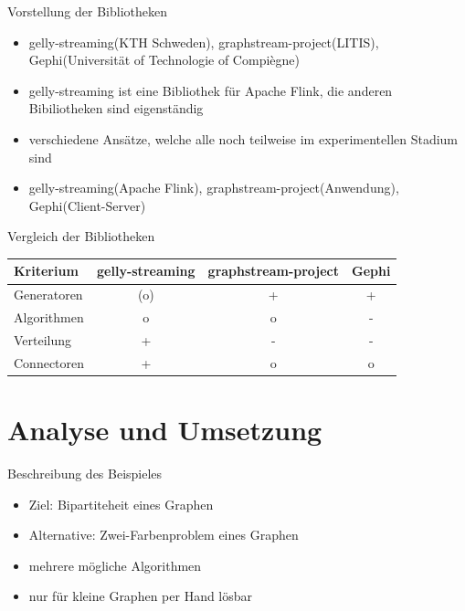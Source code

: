 \documentclass[a4paper, fontsize=11pt]{beamer}
\begin{document}
\begin{frame}{Vorstellung der Bibliotheken}
    \begin{itemize}
        \item gelly-streaming(KTH Schweden), graphstream-project(LITIS),
            Gephi(Universität of Technologie of Compiègne)
        \item gelly-streaming ist eine Bibliothek für Apache Flink, die anderen
            Bibiliotheken sind eigenständig
        \item verschiedene Ansätze, welche alle noch teilweise im experimentellen
            Stadium sind
        \item gelly-streaming(Apache Flink), graphstream-project(Anwendung),
            Gephi(Client-Server)
    \end{itemize}
\end{frame}

\begin{frame}{Vergleich der Bibliotheken}
    \begin{table}
        \begin{tabular}{l|c|c|c}
            Kriterium & gelly-streaming & graphstream-project & Gephi \\
            \hline
            Generatoren & (o) & + & + \\
            Algorithmen & o & o & - \\
            Verteilung & + & - & - \\
            Connectoren & + & o & o \\
        \end{tabular}
    \end{table}
\end{frame}

\section{Analyse und Umsetzung}
\begin{frame}{Beschreibung des Beispieles}
    \begin{itemize}
        \item Ziel: Bipartiteheit eines Graphen
        \item Alternative: Zwei-Farbenproblem eines Graphen
        \item mehrere mögliche Algorithmen
        \item nur für kleine Graphen per Hand lösbar
    \end{itemize}
\end{frame}
\end{document}
